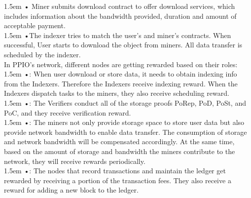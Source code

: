 \documentclass[10pt,a4paper]{article}
\begin{document}
\hangindent 1.5em
\noindent   
• Miner submits download contract to offer download services, which includes information about the bandwidth provided, duration and amount of acceptable payment.
  \vspace{-0.8em}
\\

\hangindent 1.5em
\noindent   
•\quad The indexer tries to match the user’s and miner’s contracts. When successful, User starts to download the object from miners. All data transfer is scheduled by the indexer.
  \vspace{-0.5em}
\\


\noindent   
In PPIO’s network, different nodes are getting rewarded based on their roles:
  \vspace{-0.8em}
\\

\hangindent 1.5em
\noindent   
•: When user download or store data, it needs to obtain indexing info from the Indexers. Therefore the Indexers receive indexing reward. When the Indexers dispatch tasks to the miners,  they also receive scheduling reward.  
  \vspace{-0.8em}
\\

\hangindent 1.5em
\noindent   
•: The Verifiers conduct all of the storage proofs PoRep, PoD, PoSt, and PoC, and they receive verification reward.
  \vspace{-0.8em}
\\

\hangindent 1.5em
\noindent   
•: The miners not only provide storage space to store user data but also provide network bandwidth to enable data transfer. The consumption of storage and network bandwidth will be compensated accordingly. At the same time, based on the amount of storage and bandwidth the miners contribute to the network, they will receive rewards periodically.
  \vspace{-0.8em}
\\

\hangindent 1.5em
\noindent   
•: The nodes that record transactions and maintain the ledger get rewarded by receiving a portion of the transaction fees. They also receive a reward for adding a new block to the ledger.
  \vspace{-0.5em}
\end{document}
